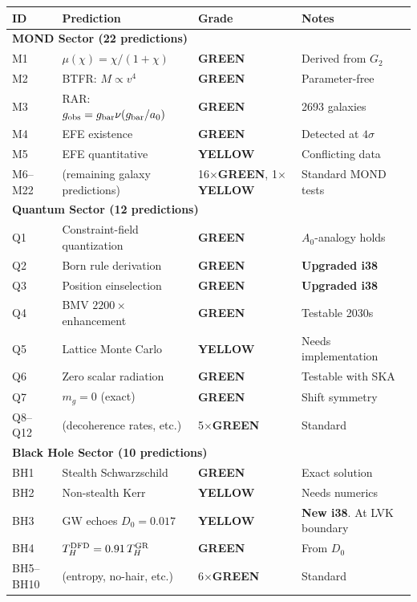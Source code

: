 \documentclass[11pt,a4paper]{article}
\newcommand{\GREEN}{\textcolor{dfdgreen}{\textbf{GREEN}}}
\newcommand{\YELLOW}{\textcolor{dfdyellow}{\textbf{YELLOW}}}
\begin{document}
\begin{center}
\begin{longtable}{p{1cm}p{6cm}p{1.5cm}p{4cm}}
\toprule
\textbf{ID} & \textbf{Prediction} & \textbf{Grade} & \textbf{Notes} \\
\midrule
\endhead
\multicolumn{4}{l}{\textbf{MOND Sector (22 predictions)}} \\
\midrule
M1 & $\mu(\chi) = \chi/(1+\chi)$ & \GREEN & Derived from $G_2$ \\
M2 & BTFR: $M \propto v^4$ & \GREEN & Parameter-free \\
M3 & RAR: $g_{\rm obs} = g_{\rm bar}\nu(g_{\rm bar}/a_0)$ & \GREEN & 2693 galaxies \\
M4 & EFE existence & \GREEN & Detected at $4\sigma$ \\
M5 & EFE quantitative & \YELLOW & Conflicting data \\
M6--M22 & (remaining galaxy predictions) & 16$\times$\GREEN, 1$\times$\YELLOW & Standard MOND tests \\
\midrule
\multicolumn{4}{l}{\textbf{Quantum Sector (12 predictions)}} \\
\midrule
Q1 & Constraint-field quantization & \GREEN & $A_0$-analogy holds \\
Q2 & Born rule derivation & \GREEN & \textbf{Upgraded i38} \\
Q3 & Position einselection & \GREEN & \textbf{Upgraded i38} \\
Q4 & BMV $2200\times$ enhancement & \GREEN & Testable 2030s \\
Q5 & Lattice Monte Carlo & \YELLOW & Needs implementation \\
Q6 & Zero scalar radiation & \GREEN & Testable with SKA \\
Q7 & $m_g = 0$ (exact) & \GREEN & Shift symmetry \\
Q8--Q12 & (decoherence rates, etc.) & 5$\times$\GREEN & Standard \\
\midrule
\multicolumn{4}{l}{\textbf{Black Hole Sector (10 predictions)}} \\
\midrule
BH1 & Stealth Schwarzschild & \GREEN & Exact solution \\
BH2 & Non-stealth Kerr & \YELLOW & Needs numerics \\
BH3 & GW echoes $D_0 = 0.017$ & \YELLOW & \textbf{New i38}. At LVK boundary \\
BH4 & $T_H^{\rm DFD} = 0.91\,T_H^{\rm GR}$ & \GREEN & From $D_0$ \\
BH5--BH10 & (entropy, no-hair, etc.) & 6$\times$\GREEN & Standard \\

\end{longtable}
\end{center}
\end{document}
